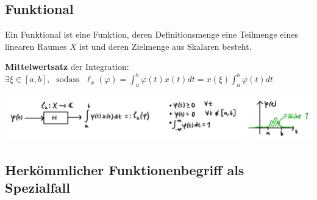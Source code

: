 \documentclass[11pt]{article}
\begin{document}
\subsection*{Funktional}
\vspace*{-0.5cm}
Ein Funktional ist eine Funktion, deren Definitionsmenge eine Teilmenge eines linearen Raumes $X$ ist und deren Zielmenge aus Skalaren besteht.

\textbf{Mittelwertsatz} der Integration: $\exists \xi \in [a,b], \; \text{  sodass  } \; \ell_x(\varphi) = \displaystyle\int_a^b \varphi(t)x(t)dt = x(\xi)\displaystyle\int_a^b \varphi(t)dt$
\vspace*{-0.5cm}
\begin{center}
    \includegraphics[width=\linewidth]{docimgs/Funktionale_1.jpg}
\end{center}

\vspace*{-0.5cm}
\subsection*{Herkömmlicher Funktionenbegriff als Spezialfall}
\vspace*{-0.5cm}
\end{document}
